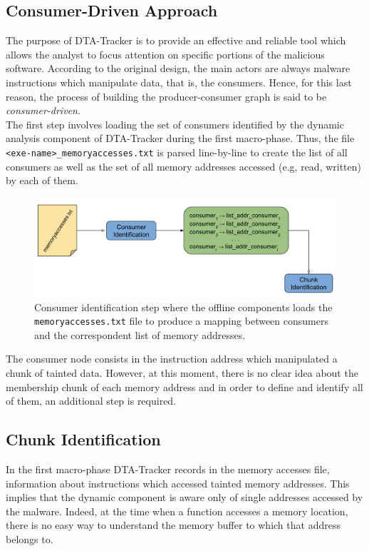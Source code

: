 \documentclass[LaM,binding=0.6cm]{sapthesis}
\begin{document}
\subsection{Consumer-Driven Approach}
The purpose of {\sf DTA-Tracker} is to provide an effective and reliable tool which allows the analyst to focus attention on specific portions of the malicious software. According to the original design, the main actors are always malware instructions which manipulate data, that is, the consumers. Hence, for this last reason, the process of building the producer-consumer graph is said to be \textit{consumer-driven}.\\

The first step involves loading the set of consumers identified by the dynamic analysis component of {\sf DTA-Tracker} during the first macro-phase. Thus, the file \texttt{<exe-name>\_memoryaccesses.txt} is parsed line-by-line to create the list of all consumers as well as the set of all memory addresses accessed (e.g, read, written) by each of them.

\begin{figure}[h!]
\centering
\vspace{-1mm}
\includegraphics[scale=.48]{images/dtatracker4}
\vspace{-3mm}
\caption{Consumer identification step where the offline components loads the \texttt{memoryaccesses.txt} file to produce a mapping between consumers and the correspondent list of memory addresses.}
\vspace{-1mm}
\end{figure}

\noindent
The consumer node consists in the instruction address which manipulated a chunk of tainted data. However, at this moment, there is no clear idea about the membership chunk of each memory address and in order to define and identify all of them, an additional step is required.
\subsection{Chunk Identification}
\label{subsec:chunkidentification}
In the first macro-phase {\sf DTA-Tracker} records in the memory accesses file, information about instructions which accessed tainted memory addresses. This implies that the dynamic component is aware only of single addresses accessed by the malware. Indeed, at the time when a function accesses a memory location, there is no easy way to understand the memory buffer to which that address belongs to.
\end{document}
